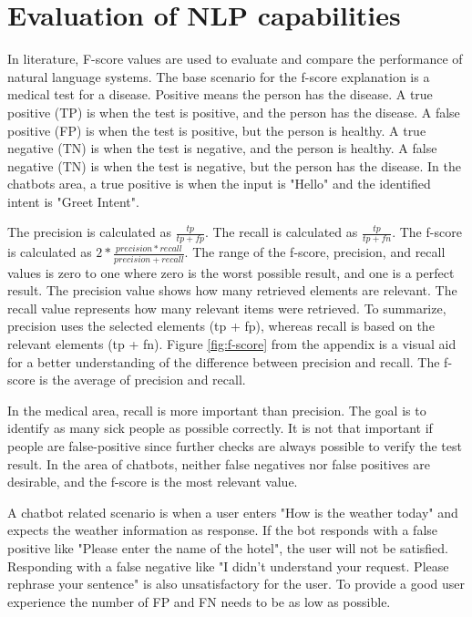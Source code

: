 \section{Evaluation of NLP capabilities}
In literature, F-score values are used to evaluate and compare the performance of natural language systems.
The base scenario for the f-score explanation is a medical test for a disease.
Positive means the person has the disease.
A true positive (TP) is when the test is positive, and the person has the disease.
A false positive (FP) is when the test is positive, but the person is healthy.
A true negative (TN) is when the test is negative, and the person is healthy.
A false negative (TN) is when the test is negative, but the person has the disease.
In the chatbots area, a true positive is when the input is "Hello" and the identified intent is "Greet Intent".

The precision is calculated as $\frac{tp}{tp + fp}$.
The recall is calculated as $\frac{tp}{tp + fn}$.
The f-score is calculated as $2 * \frac{precision * recall}{precision + recall}$.
The range of the f-score, precision, and recall values is zero to one where zero is the worst possible result, and one is a perfect result.
The precision value shows how many retrieved elements are relevant.
The recall value represents how many relevant items were retrieved.
To summarize, precision uses the selected elements (tp + fp), whereas recall is based on the relevant elements (tp + fn).
Figure \ref{fig:f-score} from the appendix is a visual aid for a better understanding of the difference between precision and recall.
The f-score is the average of precision and recall.

In the medical area, recall is more important than precision.
The goal is to identify as many sick people as possible correctly.
It is not that important if people are false-positive since further checks are always possible to verify the test result.
In the area of chatbots, neither false negatives nor false positives are desirable, and the f-score is the most relevant value.

A chatbot related scenario is when a user enters "How is the weather today" and expects the weather information as response.
If the bot responds with a false positive like "Please enter the name of the hotel", the user will not be satisfied.
Responding with a false negative like "I didn't understand your request. Please rephrase your sentence" is also unsatisfactory for the user.
To provide a good user experience the number of FP and FN needs to be as low as possible.


